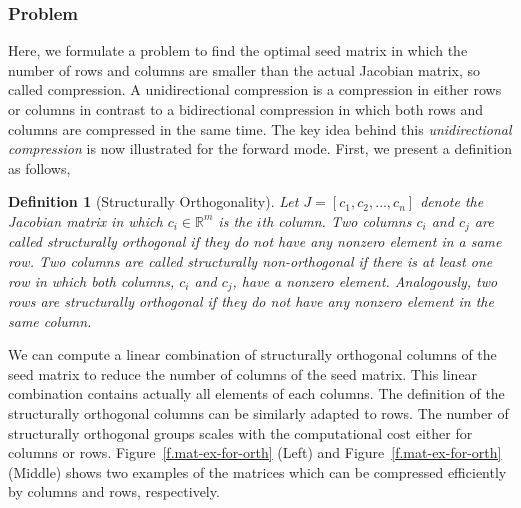 \documentclass[11pt, twoside,a4paper]{book}
\newtheorem{definition}{Definition}
\newcommand{\figref}[1]{Figure~\protect\ref{#1}}
\newcommand{\setR}{\ensuremath{\mathbb{R}}}
\begin{document}
\subsubsection{Problem}
\label{ss.problem.full}
Here, we formulate a problem to find the optimal seed matrix in which
the number of rows and columns are smaller than the actual Jacobian matrix, so called compression.
A unidirectional compression is a compression in either rows or columns in contrast to
a bidirectional compression in which both rows and columns are compressed in the same time.
The key idea behind this \emph{unidirectional compression} is now illustrated for the
forward mode. First, we present a definition as follows,
\begin{definition}[Structurally Orthogonality]
\label{d:struct_orth}
Let $J=[c_1, c_2, \dots, c_n]$ denote the Jacobian matrix in which $c_i \in \setR^m$ is the $i$th
column. Two columns $c_i$ and $c_j$ are
called \emph{structurally orthogonal} if they do not have any nonzero element in a same
row. Two columns are called \emph{structurally non-orthogonal} if there is at least one
row in which both columns, $c_i$ and $c_j$, have a nonzero element.
Analogously, two rows are
\emph{structurally orthogonal} if they do not have any nonzero element in the same column.
\end{definition}
We can compute a linear combination of structurally orthogonal columns of the seed matrix
to reduce the number of columns of the seed matrix. This linear combination contains actually all elements of each columns. The definition of the structurally orthogonal columns can be similarly adapted to rows. The number of structurally orthogonal groups scales with the computational cost either for columns or rows.
\figref{f.mat-ex-for-orth} (Left) and \figref{f.mat-ex-for-orth} (Middle) shows two examples
of the matrices which can be compressed efficiently by columns and rows, respectively.
\end{document}

